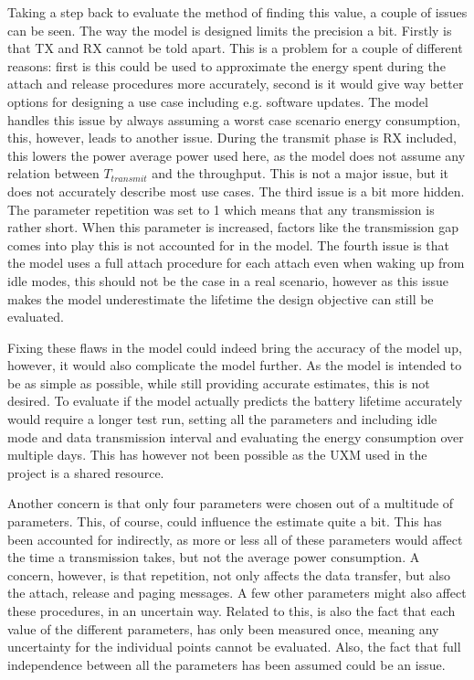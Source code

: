 Taking a step back to evaluate the method of finding this value, a couple of issues can be seen. The way the model is designed limits the precision a bit. Firstly is that TX and RX cannot be told apart. This is a problem for a couple of different reasons: first is this could be used to approximate the energy spent during the attach and release procedures more accurately, second is it would give way better options for designing a use case including e.g. software updates. The model handles this issue by always assuming a worst case scenario energy consumption, this, however, leads to another issue. During the transmit phase is RX included, this lowers the power average power used here, as the model does not assume any relation between $T_{transmit}$ and the throughput. This is not a major issue, but it does not accurately describe most use cases. The third issue is a bit more hidden. The parameter repetition was set to 1 which means that any transmission is rather short. When this parameter is increased, factors like the transmission gap comes into play this is not accounted for in the model. The fourth issue is that the model uses a full attach procedure for each attach even when waking up from idle modes, this should not be the case in a real scenario, however as this issue makes the model underestimate the lifetime the design objective can still be evaluated.

Fixing these flaws in the model could indeed bring the accuracy of the model up, however, it would also complicate the model further. As the model is intended to be as simple as possible, while still providing accurate estimates, this is not desired. To evaluate if the model actually predicts the battery lifetime accurately would require a longer test run, setting all the parameters and including idle mode and data transmission interval and evaluating the energy consumption over multiple days. This has however not been possible as the UXM used in the project is a shared resource. 

Another concern is that only four parameters were chosen out of a multitude of parameters. This, of course, could influence the estimate quite a bit. This has been accounted for indirectly, as more or less all of these parameters would affect the time a transmission takes, but not the average power consumption. A concern, however, is that repetition, not only affects the data transfer, but also the attach, release and paging messages. A few other parameters might also affect these procedures, in an uncertain way. Related to this, is also the fact that each value of the different parameters, has only been measured once, meaning any uncertainty for the individual points cannot be evaluated. Also, the fact that full independence between all the parameters has been assumed could be an issue. 

